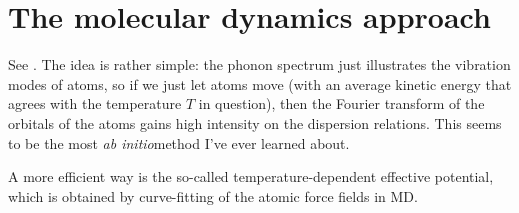 \documentclass[hyperref, a4paper]{article}
\newcommand*{\abinitio}{\textit{ab initio}}
\begin{document}
\section{The molecular dynamics approach}

See \cite{zhang2022finite}. 
The idea is rather simple: 
the phonon spectrum just illustrates 
the vibration modes of atoms,
so if we just let atoms move 
(with an average kinetic energy that agrees 
with the temperature $T$ in question),
then the Fourier transform 
of the orbitals of the atoms 
gains high intensity 
on the dispersion relations.
This seems to be the most \abinitio method I've ever learned about.

A more efficient way is the so-called temperature-dependent effective potential,
which is obtained by curve-fitting of the atomic force fields in MD.

\printbibliography
\end{document}
